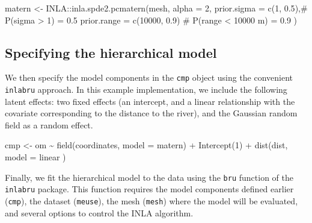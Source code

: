 \documentclass[
  a4paper,
]{article}
\newenvironment{Shaded}{\begin{snugshade}}{\end{snugshade}}
\newcommand{\AttributeTok}[1]{\textcolor[rgb]{0.40,0.45,0.13}{#1}}
\newcommand{\CommentTok}[1]{\textcolor[rgb]{0.37,0.37,0.37}{#1}}
\newcommand{\DecValTok}[1]{\textcolor[rgb]{0.68,0.00,0.00}{#1}}
\newcommand{\FloatTok}[1]{\textcolor[rgb]{0.68,0.00,0.00}{#1}}
\newcommand{\FunctionTok}[1]{\textcolor[rgb]{0.28,0.35,0.67}{#1}}
\newcommand{\NormalTok}[1]{\textcolor[rgb]{0.00,0.23,0.31}{#1}}
\newcommand{\OtherTok}[1]{\textcolor[rgb]{0.00,0.23,0.31}{#1}}
\newcommand{\SpecialCharTok}[1]{\textcolor[rgb]{0.37,0.37,0.37}{#1}}
\newcommand{\StringTok}[1]{\textcolor[rgb]{0.13,0.47,0.30}{#1}}
\begin{document}
\begin{Shaded}
\begin{Highlighting}[]
\NormalTok{matern }\OtherTok{\textless{}{-}}
\NormalTok{  INLA}\SpecialCharTok{::}\FunctionTok{inla.spde2.pcmatern}\NormalTok{(mesh,}
                      \AttributeTok{alpha =} \DecValTok{2}\NormalTok{,}
                      \AttributeTok{prior.sigma =} \FunctionTok{c}\NormalTok{(}\DecValTok{1}\NormalTok{, }\FloatTok{0.5}\NormalTok{),}\CommentTok{\# P(sigma \textgreater{} 1) = 0.5}
                      \AttributeTok{prior.range =} \FunctionTok{c}\NormalTok{(}\DecValTok{10000}\NormalTok{, }\FloatTok{0.9}\NormalTok{)  }\CommentTok{\# P(range \textless{} 10000 m) = 0.9}
\NormalTok{  )}
\end{Highlighting}
\end{Shaded}

\hypertarget{specifying-the-hierarchical-model}{%
\subsection{Specifying the hierarchical
model}\label{specifying-the-hierarchical-model}}

We then specify the model components in the \texttt{cmp} object using
the convenient \texttt{inlabru} approach. In this example
implementation, we include the following latent effects: two fixed
effects (an intercept, and a linear relationship with the covariate
corresponding to the distance to the river), and the Gaussian random
field as a random effect.

\begin{Shaded}
\begin{Highlighting}[]
\NormalTok{cmp }\OtherTok{\textless{}{-}}\NormalTok{ om }\SpecialCharTok{\textasciitilde{}} 
  \FunctionTok{field}\NormalTok{(coordinates, }\AttributeTok{model =}\NormalTok{ matern) }\SpecialCharTok{+} 
  \FunctionTok{Intercept}\NormalTok{(}\DecValTok{1}\NormalTok{) }\SpecialCharTok{+} 
  \FunctionTok{dist}\NormalTok{(dist, }\AttributeTok{model =} \StringTok{\textquotesingle{}linear\textquotesingle{}}\NormalTok{ )     }
\end{Highlighting}
\end{Shaded}

Finally, we fit the hierarchical model to the data using the
\texttt{bru} function of the \texttt{inlabru} package. This function
requires the model components defined earlier (\texttt{cmp}), the
dataset (\texttt{meuse}), the mesh (\texttt{mesh}) where the model will
be evaluated, and several options to control the INLA algorithm.
\end{document}
